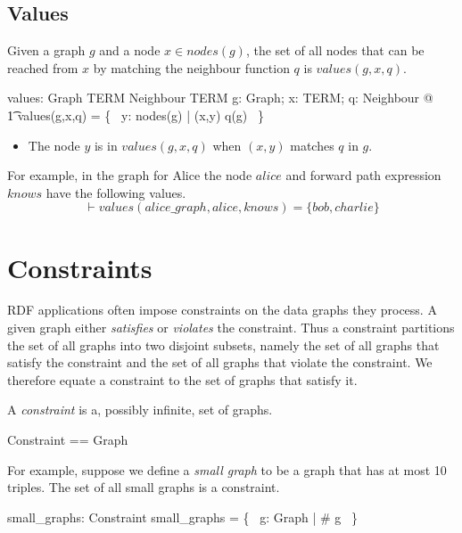 \documentclass{article}
\begin{document}
\subsection{Values}

Given a graph $g$ and a node $x \in nodes(g)$, the set of all nodes that can be reached from $x$ by matching the neighbour function $q$  is $values(g,x,q)$.
\begin{axdef}
values: Graph \cross TERM \cross Neighbour \fun \finset TERM
\where
\forall g: Graph; x: TERM; q: Neighbour @ \\
\t1	values(g,x,q) = \{~ y: nodes(g) | (x,y) \in q(g) ~\}
\end{axdef}
\begin{itemize}
\item The node $y$ is in $values(g,x,q)$ when $(x,y)$ matches $q$ in $g$.
\end{itemize}

For example, in the graph for Alice the node $alice$ and forward path expression $knows$ have the following values.
\[\vdash 
	values(alice\_graph, alice, knows) = \{bob, charlie\}
\]

\section{Constraints}
\label{sec-constraints}

RDF applications often impose constraints on the data graphs they process.
A given graph either {\em satisfies} or {\em violates} the constraint.
Thus a constraint partitions the set of all graphs into two disjoint subsets,
namely the set of all graphs that satisfy the constraint and the set of all graphs that violate the constraint.
We therefore equate a constraint to the set of graphs that satisfy it.

A {\em constraint} is a, possibly infinite, set of graphs. 
\begin{zed}
	Constraint == \power Graph
\end{zed}

For example, suppose we define a {\em small graph} to be a graph that has at most 10 triples.
The set of all small graphs is a constraint.
\begin{axdef}
	small\_graphs: Constraint
\where
	small\_graphs = \{~ g: Graph | \# g  ~\}
\end{axdef}
\end{document}
